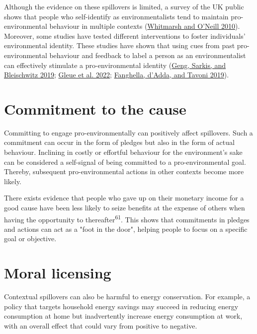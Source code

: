 \documentclass[
  12pt,
  captions=heading]{scrreport}
\begin{document}
Although the evidence on these spillovers is limited, a survey of the UK
public shows that people who self-identify as environmentalists tend to
maintain pro-environmental behaviour in multiple contexts
(\protect\hyperlink{ref-whitmarsh2010green}{Whitmarsh and O'Neill
2010}). Moreover, some studies have tested different interventions to
foster individuals' environmental identity. These studies have shown
that using cues from past pro-environmental behaviour and feedback to
label a person as an environmentalist can effectively stimulate a
pro-environmental identity
(\protect\hyperlink{ref-geng2019globalize}{Geng, Sarkis, and Bleischwitz
2019}; \protect\hyperlink{ref-gleue2022identity}{Gleue et al. 2022};
\protect\hyperlink{ref-fanghella2019use}{Fanghella, d'Adda, and Tavoni
2019}).

\hypertarget{commitment-to-the-cause}{%
\section{Commitment to the cause}\label{commitment-to-the-cause}}

Committing to engage pro-environmentally can positively affect
spillovers. Such a commitment can occur in the form of pledges but also
in the form of actual behaviour. Inclining in costly or effortful
behaviour for the environment's sake can be considered a self-signal of
being committed to a pro-environmental goal. Thereby, subsequent
pro-environmental actions in other contexts become more likely.

There exists evidence that people who gave up on their monetary income
for a good cause have been less likely to seize benefits at the expense
of others when having the opportunity to thereafter\textsuperscript{61}.
This shows that commitments in pledges and actions can act as a "foot in
the door", helping people to focus on a specific goal or objective.

\hypertarget{moral-licensing}{%
\section{Moral licensing}\label{moral-licensing}}

Contextual spillovers can also be harmful to energy conservation. For
example, a policy that targets household energy savings may succeed in
reducing energy consumption at home but inadvertently increase energy
consumption at work, with an overall effect that could vary from
positive to negative.
\end{document}
